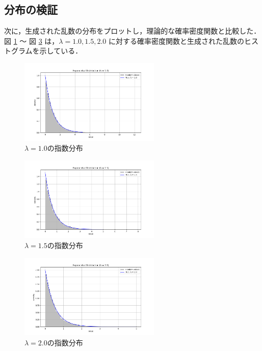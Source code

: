 \documentclass[fleqn, a4paper. 12pt]{jsarticle}
\begin{document}
    \subsection*{分布の検証}
    次に，生成された乱数の分布をプロットし，理論的な確率密度関数と比較した．図 \ref{fig:1} 〜 図 \ref{fig:3} は，$\lambda = 1.0, 1.5, 2.0$ に対する確率密度関数と生成された乱数のヒストグラムを示している．

    \begin{figure}[!h]
      \centering
      \includegraphics[width=0.6\textwidth]{lambda_1.0_plot.png}
      \caption{ $\lambda = 1.0$の指数分布}
      \label{fig:1}
    \end{figure}

    \begin{figure}[!h]
      \centering
      \includegraphics[width=0.6\textwidth]{lambda_1.5_plot.png}
      \caption{ $\lambda = 1.5$の指数分布}
      \label{fig:2}
    \end{figure}

    \begin{figure}[!h]
      \centering
      \includegraphics[width=0.6\textwidth]{lambda_2.0_plot.png}
      \caption{ $\lambda = 2.0$の指数分布}
      \label{fig:3}
    \end{figure}
\end{document}
